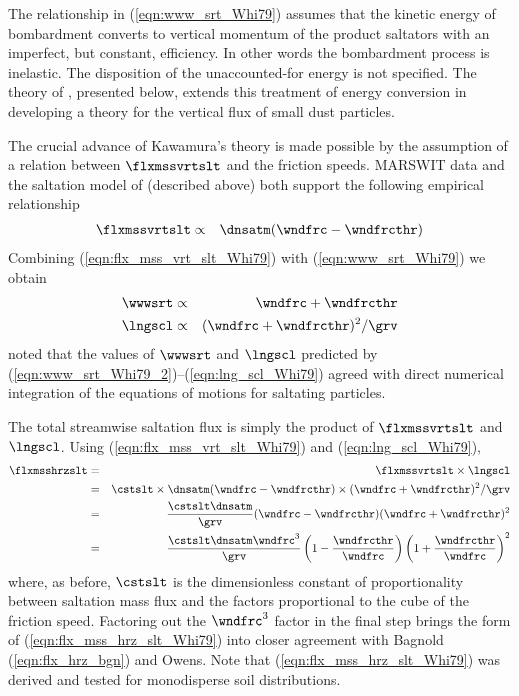 \documentclass[12pt,twoside]{book}
\begin{document}
The relationship in (\ref{eqn:www_srt_Whi79}) assumes that the kinetic 
energy of bombardment converts to vertical momentum of the product
saltators with an imperfect, but constant, efficiency. 
In other words the bombardment process is inelastic.
The disposition of the unaccounted-for energy is not specified.
The theory of \cite{SRF93}, presented below, extends this treatment of
energy conversion in developing a theory for the vertical flux of
small dust particles.

The crucial advance of Kawamura's theory is made possible by the
assumption of a relation between $\flxmssvrtslt$ and the friction
speeds. 
MARSWIT data and the saltation model of \cite{Whi79} (described above)
both support the following empirical relationship 
\begin{eqnarray}
\flxmssvrtslt & \propto & \dnsatm ( \wndfrc - \wndfrcthr )
\label{eqn:flx_mss_vrt_slt_Whi79}
\end{eqnarray}
Combining (\ref{eqn:flx_mss_vrt_slt_Whi79}) with
(\ref{eqn:www_srt_Whi79}) we obtain 
\begin{eqnarray}
\label{eqn:www_srt_Whi79_2}
\wwwsrt & \propto & \wndfrc + \wndfrcthr \\
\label{eqn:lng_scl_Whi79}
\lngscl & \propto & ( \wndfrc + \wndfrcthr )^{2} / \grv
\end{eqnarray}
\cite{Whi79} noted that the values of $\wwwsrt$ and $\lngscl$
predicted by (\ref{eqn:www_srt_Whi79_2})--(\ref{eqn:lng_scl_Whi79})
agreed with direct numerical integration of the equations of motions
for saltating particles. 

The total streamwise saltation flux is simply the product of
$\flxmssvrtslt$ and $\lngscl$.
Using (\ref{eqn:flx_mss_vrt_slt_Whi79}) and (\ref{eqn:lng_scl_Whi79}),  
\begin{eqnarray}
\flxmsshrzslt & = & \flxmssvrtslt \times \lngscl \nonumber \\
& = & \cstslt \times \dnsatm (\wndfrc - \wndfrcthr) \times 
(\wndfrc + \wndfrcthr)^{2} / \grv \nonumber \\
& = & \frac{\cstslt \dnsatm}{\grv} (\wndfrc - \wndfrcthr)(\wndfrc + \wndfrcthr)^{2} \nonumber \\
& = & \frac{\cstslt \dnsatm \wndfrc^{3}}{\grv} 
\left( 1 - \frac{\wndfrcthr}{\wndfrc} \right) 
\left( 1 + \frac{\wndfrcthr}{\wndfrc} \right)^{2}
\label{eqn:flx_mss_hrz_slt_Whi79}
\end{eqnarray}
where, as before, $\cstslt$ is the dimensionless constant of
proportionality between saltation mass flux and the factors
proportional to the cube of the friction speed. 
Factoring out the $\wndfrc^{3}$ factor in the final step brings the form
of (\ref{eqn:flx_mss_hrz_slt_Whi79}) into closer agreement with
Bagnold (\ref{eqn:flx_hrz_bgn}) and Owens. %
Note that (\ref{eqn:flx_mss_hrz_slt_Whi79}) was derived and tested
for monodisperse soil distributions. 
\end{document}
